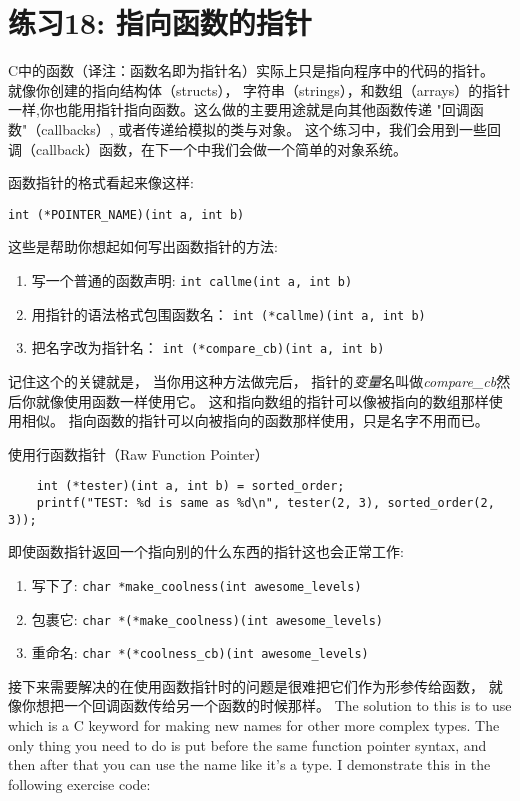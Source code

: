 \chapter{练习18: 指向函数的指针}

C中的函数（译注：函数名即为指针名）实际上只是指向程序中的代码的指针。 就像你创建的指向结构体（structs）， 字符串（strings），和数组（arrays）的指针一样,你也能用指针指向函数。这么做的主要用途就是向其他函数传递
"回调函数"（callbacks）, 或者传递给模拟的类与对象。 这个练习中，我们会用到一些回调（callback）函数，在下一个中我们会做一个简单的对象系统。

函数指针的格式看起来像这样:

\verb|int (*POINTER_NAME)(int a, int b)|

这些是帮助你想起如何写出函数指针的方法:

\begin{enumerate}
\item 写一个普通的函数声明: \verb|int callme(int a, int b)|
\item 用指针的语法格式包围函数名： \verb|int (*callme)(int a, int b)|
\item 把名字改为指针名： \verb|int (*compare_cb)(int a, int b)|
\end{enumerate}

记住这个的关键就是， 当你用这种方法做完后， 指针的\emph{变量}名叫做\emph{compare\_cb}然后你就像使用函数一样使用它。  这和指向数组的指针可以像被指向的数组那样使用相似。 指向函数的指针可以向被指向的函数那样使用，只是名字不用而已。

\begin{code}{使用行函数指针（Raw Function Pointer）}
\begin{lstlisting}
    int (*tester)(int a, int b) = sorted_order;
    printf("TEST: %d is same as %d\n", tester(2, 3), sorted_order(2, 3)); 
\end{lstlisting}
\end{code}

即使函数指针返回一个指向别的什么东西的指针这也会正常工作:

\begin{enumerate}
\item 写下了: \verb|char *make_coolness(int awesome_levels)|
\item 包裹它: \verb|char *(*make_coolness)(int awesome_levels)|
\item 重命名: \verb|char *(*coolness_cb)(int awesome_levels)|
\end{enumerate}

接下来需要解决的在使用函数指针时的问题是很难把它们作为形参传给函数， 就像你想把一个回调函数传给另一个函数的时候那样。 The solution to this is to use 
which is a C keyword for making new names for other more complex types.
The only thing you need to do is put  before the same 
function pointer syntax, and then after that you can use the name like
it's a type.  I demonstrate this in the following exercise code:

